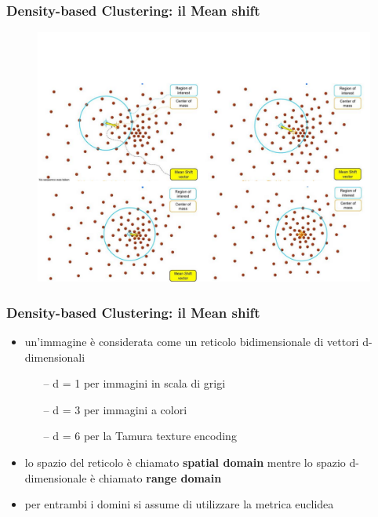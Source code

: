 \begin{frame}

	\frametitle{{\color{GradientDescentDiagramRed}Density-based Clustering}: il Mean shift}


		\begin{figure}[!htbp]
			\centering
			\includegraphics[width=0.95\linewidth]{images/unsupervised/non_parametric/mean_shift_how_works.pdf}
		\end{figure}


\end{frame}


\begin{frame}

	\frametitle{{\color{GradientDescentDiagramRed}Density-based Clustering}: il Mean shift}


		\begin{itemize}
			\item un'immagine è considerata come un reticolo bidimensionale di vettori d-dimensionali
				\begin{itemize}
					\item[--] d = 1 per immagini in scala di grigi
					\item[--] d = 3 per immagini a colori
					\item[--] d = 6 per la Tamura texture encoding
				\end{itemize}
			\item lo spazio del reticolo è chiamato \textbf{spatial domain} mentre lo spazio d-dimensionale è chiamato \textbf{range domain}
			\item per entrambi i domini si assume di utilizzare la metrica euclidea
		\end{itemize}



\end{frame}


